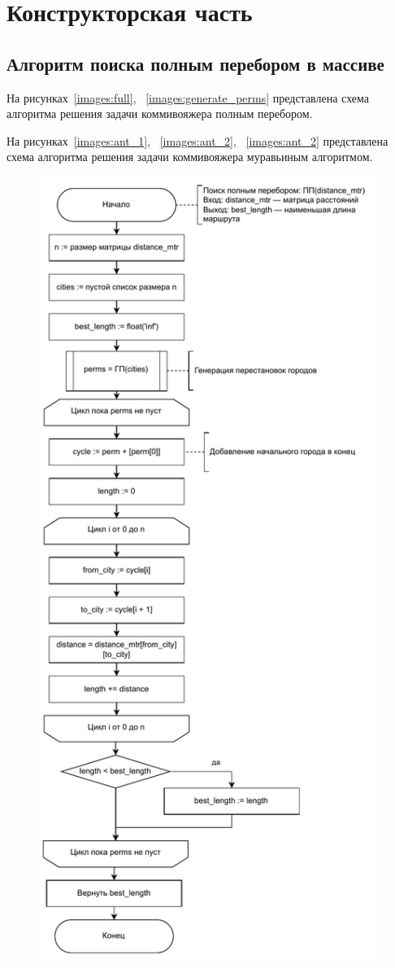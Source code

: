 \chapter{Конструкторская часть}

\section{Алгоритм поиска полным перебором в массиве}

На рисунках~\ref{images:full}, ~\ref{images:generate_perms} представлена схема алгоритма решения задачи коммивояжера полным перебором.

На рисунках~\ref{images:ant_1}, ~\ref{images:ant_2}, ~\ref{images:ant_2} представлена схема алгоритма решения задачи коммивояжера муравьиным алгоритмом.


\begin{figure}[H]
    \centering
    \includegraphics[width=110mm]{images/full}

\end{figure}
